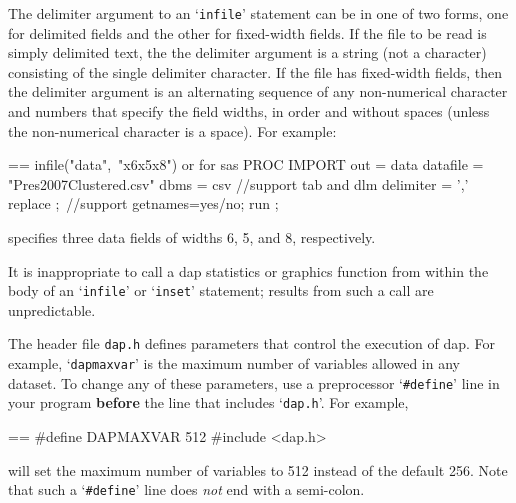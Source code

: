 \documentclass{book}
\makeatletter
\newenvironment{Texinfopreformatted}{%
  \par\GNUTobeylines\obeyspaces\frenchspacing\parskip=\z@\parindent=\z@}{}
{\catcode`\^^M=13 \gdef\GNUTobeylines{\catcode`\^^M=13 \def^^M{\null\par}}}
\newenvironment{Texinfoindented}{\begin{list}{}{}\item\relax}{\end{list}}
\renewcommand{\_}{\Texinfounderscore\discretionary{}{}{}}
\makeatother
\begin{document}
The delimiter
%
argument to an `\texttt{infile}'
%
statement can be in one of two forms, one for
delimited fields and the other for fixed-width
%
fields.
If the file to be read is simply delimited text, the
the delimiter argument is a string (not a character) consisting
of the single delimiter character.  If the file has fixed-width fields, then
the delimiter argument is an alternating sequence of any non-numerical
character and numbers that specify the field widths, in order and
without spaces (unless the non-numerical character is a space).  For
example:

\begin{Texinfoindented}
\begin{Texinfopreformatted}%
\ttfamily infile("data",\ "x6x5x8")
or for sas
PROC IMPORT  out = data datafile =  "Pres2007Clustered.csv"  dbms  = csv //support tab and dlm
delimiter = ',' replace ;\  //support getnames=yes/no;
run ;
\end{Texinfopreformatted}
\end{Texinfoindented}
\noindent{}specifies three data fields of widths 6, 5, and 8, respectively.

It is inappropriate to call a dap statistics or graphics function from
within the body of an `\texttt{infile}' or `\texttt{inset}' statement; results from such a
call are unpredictable.

The header file \texttt{dap.h} defines parameters
%
%
%
%
%
%
that control the execution of dap.  For example, `\texttt{dap\_maxvar}' is the maximum
number of variables allowed in any dataset.
To change any of these parameters, use a preprocessor `\texttt{\#define}' line
in your program \textbf{before} the line that includes `\texttt{dap.h}'.
For example,

\begin{Texinfoindented}
\begin{Texinfopreformatted}%
\ttfamily \#define DAP\_MAXVAR 512
\#include <dap.h>
\end{Texinfopreformatted}
\end{Texinfoindented}
\noindent{}will set the maximum number of variables to 512 instead of the default 256.
Note that such a `\texttt{\#define}' line does \emph{not} end with a semi-colon.
\end{document}

